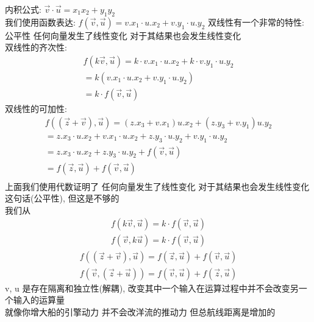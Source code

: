 \documentclass[12pt]{article}
\begin{document}
\begin{flushleft}
\begin{itemize}
              内积公式: $\vec{v} \cdot \vec{u} = x_{1}x_{2} + y_{1}y_{2}$ \\
              我们使用函数表达:
              $f(\vec{v}, \vec{u}) = v.x_{1} \cdot u.x_{2} + v.y_{1} \cdot u.y_{2}$
              双线性有一个非常的特性: 公平性 任何向量发生了线性变化 对于其结果也会发生线性变化 \\
              双线性的齐次性: \\
              \begin{align}
                  f(k\vec{v}, \vec{u}) = k \cdot v.x_{1} \cdot u.x_{2} + k \cdot v.y_{1} \cdot u.y_{2} \\
                  = k(v.x_{1} \cdot u.x_{2} + v.y_{1} \cdot u.y_{2})                                   \\
                  = k \cdot f(\vec{v}, \vec{u})
              \end{align}
              双线性的可加性: \\
              \begin{align}
                  f((\vec{z} + \vec{v}),\vec{u}) = (z.x_{3} + v.x_{1})u.x_{2} + (z.y_{3} + v.y_{1})u.y_{2}               \\
                  = z.x_{3} \cdot u.x_{2}  +  v.x_{1} \cdot u.x_{2}  +  z.y_{3} \cdot u.y_{2} +  v.y_{1}  \cdot  u.y_{2} \\
                  =  z.x_{3} \cdot u.x_{2} +  z.y_{3} \cdot u.y_{2}  +  f(\vec{v}, \vec{u})                              \\
                  = f(\vec{z}, \vec{u}) + f(\vec{v}, \vec{u})                                                            \\
              \end{align}
              上面我们使用代数证明了 任何向量发生了线性变化 对于其结果也会发生线性变化这句话(公平性), 但这是不够的 \\

              我们从
              \begin{align}
                  f(k\vec{v}, \vec{u}) = k \cdot f(\vec{v}, \vec{u}) \\
                  f(\vec{v}, k\vec{u}) = k \cdot f(\vec{v}, \vec{u})
              \end{align}
              \begin{align}
                  f((\vec{z} + \vec{v}),\vec{u}) = f(\vec{z}, \vec{u}) + f(\vec{v}, \vec{u}) \\
                  f( \vec{v},(\vec{z} + \vec{u})) = f(\vec{v}, \vec{u}) + f(\vec{z}, \vec{u})
              \end{align}
              v, u 是存在隔离和独立性(解耦), 改变其中一个输入在运算过程中并不会改变另一个输入的运算量 \\
              就像你增大船的引擎动力 并不会改洋流的推动力 但总航线距离是增加的 \\


\end{itemize}
\end{flushleft}
\end{document}
